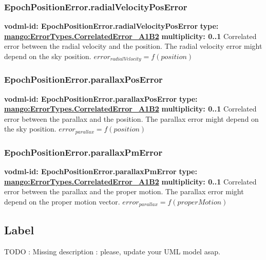     \subsubsection{EpochPositionError.radialVelocityPosError}
      \textbf{vodml-id: EpochPositionError.radialVelocityPosError} \newline
      \textbf{type: \hyperref[sect:ErrorTypes.CorrelatedError_A1B2]{mango:ErrorTypes.CorrelatedError\_A1B2}} \newline
      \textbf{multiplicity: 0..1} \newline
      Correlated error between the radial velocity and the position. The radial velocity error might depend on the sky position. $error_{radialVelocity} = f(position)$

    \subsubsection{EpochPositionError.parallaxPosError}
      \textbf{vodml-id: EpochPositionError.parallaxPosError} \newline
      \textbf{type: \hyperref[sect:ErrorTypes.CorrelatedError_A1B2]{mango:ErrorTypes.CorrelatedError\_A1B2}} \newline
      \textbf{multiplicity: 0..1} \newline
      Correlated error between the parallax and the position. The parallax error might depend on the sky position. $error_{parallax} = f(position)$

    \subsubsection{EpochPositionError.parallaxPmError}
      \textbf{vodml-id: EpochPositionError.parallaxPmError} \newline
      \textbf{type: \hyperref[sect:ErrorTypes.CorrelatedError_A1B2]{mango:ErrorTypes.CorrelatedError\_A1B2}} \newline
      \textbf{multiplicity: 0..1} \newline
      Correlated error between the parallax and the proper motion. The parallax error might depend on the proper motion vector. $error_{parallax} = f(properMotion)$

  \subsection{Label}
  \label{sect:Label}
    TODO : Missing description : please, update your UML model asap.

